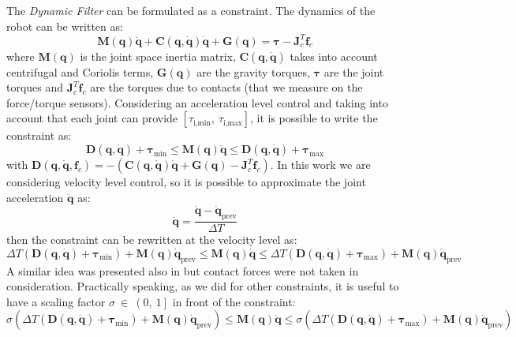 The \emph{Dynamic Filter} can be formulated as a constraint. The dynamics of the robot can be written as:
\begin{equation}
\mathbf{M}(\mathbf{q})\mathbf{\ddot{q}} + \mathbf{C}(\mathbf{q},\mathbf{\dot{q}})\mathbf{\dot{q}} + \mathbf{G}(\mathbf{q}) = \boldsymbol{\tau} - \mathbf{J}^T_c\mathbf{f}_c
\end{equation}
where $\mathbf{M}(\mathbf{q})$ is the joint space inertia matrix, $\mathbf{C}(\mathbf{q},\mathbf{\dot{q}})$ takes into account centrifugal and Coriolis terms, $\mathbf{G}(\mathbf{q})$ are the gravity torques, $\boldsymbol{\tau}$ are the joint torques and $\mathbf{J}^T_c\mathbf{f}_c$ are the torques due to contacts (that we measure on the force/torque sensors). 
Considering an acceleration level control and taking into account that each joint can provide $\left[\tau_{\text{i,min}}, \ \tau_{\text{i,max}} \right]$, it is possible to write the constraint as:
\begin{equation}
\mathbf{D}(\mathbf{q, \dot{q}}) + \boldsymbol{\tau}_\text{min}\leq \mathbf{M}(\mathbf{q})\mathbf{\ddot{q}} \leq  \mathbf{D}(\mathbf{q, \dot{q}}) + \boldsymbol{\tau}_\text{max}
\end{equation}
with $\mathbf{D}(\mathbf{q, \dot{q}},\mathbf{f}_c) = -\left(\mathbf{C}(\mathbf{q},\mathbf{\dot{q}})\mathbf{\dot{q}} + \mathbf{G}(\mathbf{q}) - \mathbf{J}^T_c\mathbf{f}_c \right )$. In this work we are considering velocity level control, so it is possible to approximate the joint acceleration $\mathbf{\ddot{q}}$ as:
\begin{equation}
\mathbf{\ddot{q}} = \frac{\mathbf{\dot{q}}-\mathbf{\dot{q}}_\text{prev}}{\Delta T}
\end{equation}
then the constraint can be rewritten at the velocity level as:
\begin{equation}
\Delta T \left(\mathbf{D}(\mathbf{q}, \mathbf{\dot{q}}) + \boldsymbol{\tau}_\text{min}\right ) + \mathbf{M}(\mathbf{q})\mathbf{\dot{q}}_\text{prev} \leq
\mathbf{M}(\mathbf{q})\mathbf{\dot{q}} 
\leq  \Delta T \left(\mathbf{D}(\mathbf{q}, \mathbf{\dot{q}}) + \boldsymbol{\tau}_\text{max}\right)+ \mathbf{M}(\mathbf{q})\mathbf{\dot{q}}_\text{prev}
\label{robot_dynamics_constraint}
\end{equation}
A similar idea was presented also in \cite{park1998-ib} but contact forces were not taken in consideration.
Practically speaking, as we did for other constraints, it is useful to have a scaling factor $\sigma \ \in \ \left(0, \ 1 \right]$ in front of the constraint:
\begin{equation}
\sigma \left(\Delta T \left(\mathbf{D}(\mathbf{q}, \mathbf{\dot{q}}) + \boldsymbol{\tau}_\text{min}\right ) + \mathbf{M}(\mathbf{q})\mathbf{\dot{q}}_\text{prev} \right)\leq
\mathbf{M}(\mathbf{q})\mathbf{\dot{q}} 
\leq  \sigma \left(\Delta T \left(\mathbf{D}(\mathbf{q}, \mathbf{\dot{q}}) + \boldsymbol{\tau}_\text{max}\right)+ \mathbf{M}(\mathbf{q})\mathbf{\dot{q}}_\text{prev}\right)
\label{robot_dynamics_constraint_2}
\end{equation}

